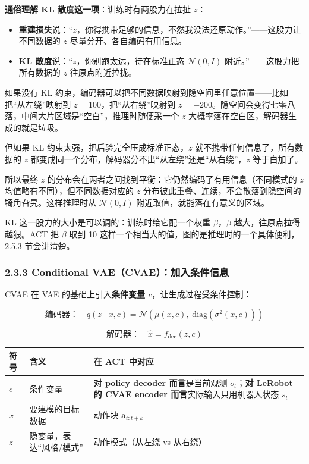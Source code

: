 \documentclass[
  chinese,
]{ctexart}
\providecommand{\tightlist}{%
  \setlength{\itemsep}{0pt}\setlength{\parskip}{0pt}}
\begin{document}
\textbf{通俗理解 KL 散度这一项}：训练时有两股力在拉扯 \(z\)：

\begin{itemize}
\tightlist
\item
  \textbf{重建损失}说：``\(z\)，你得携带足够的信息，不然我没法还原动作。''------这股力让不同数据的
  \(z\) 尽量分开、各自编码有用信息。
\item
  \textbf{KL 散度}说：``\(z\)，你别跑太远，待在标准正态
  \(\mathcal{N}(0, I)\) 附近。''------这股力把所有数据的 \(z\)
  往原点附近拉拢。
\end{itemize}

如果没有 KL
约束，编码器可以把不同数据映射到隐空间里任意位置------比如把``从左绕''映射到
\(z=100\)，把``从右绕''映射到
\(z=-200\)。隐空间会变得七零八落，中间大片区域是``空白''，推理时随便采一个
\(z\) 大概率落在空白区，解码器生成的就是垃圾。

但如果 KL 约束太强，把后验完全压成标准正态，\(z\)
就不携带任何信息了，所有数据的 \(z\)
都变成同一个分布，解码器分不出``从左绕''还是``从右绕''，\(z\)
等于白加了。

所以最终 \(z\)
的分布会在两者之间找到平衡：它仍然编码了有用信息（不同模式的 \(z\)
均值略有不同），但不同数据对应的 \(z\)
分布彼此重叠、连续，不会散落到隐空间的犄角旮旯。这样推理时从
\(\mathcal{N}(0, I)\) 附近取值，就能落在有意义的区域。

KL 这一股力的大小是可以调的：训练时给它配一个权重 \(\beta\)，\(\beta\)
越大，往原点拉得越狠。ACT 把 \(\beta\) 取到 10
这样一个相当大的值，图的是推理时的一个具体便利，2.5.3 节会讲清楚。

\subsubsection{2.3.3 Conditional
VAE（CVAE）：加入条件信息}\label{conditional-vaecvaeux52a0ux5165ux6761ux4ef6ux4fe1ux606f}

CVAE 在 VAE 的基础上引入\textbf{条件变量 \(c\)}，让生成过程受条件控制：

\[
\text{编码器：} \quad q(z \mid x, c) = \mathcal{N}\!\left(\mu(x, c),\; \text{diag}(\sigma^2(x, c))\right)
\]

\[
\text{解码器：} \quad \hat{x} = f_{\text{dec}}(z, c)
\]

\begin{center}
\begin{tabular}{@{}>{\raggedright\arraybackslash}p{} >{\raggedright\arraybackslash}p{} >{\raggedright\arraybackslash}p{}@{}}
\toprule\noalign{}
符号 & 含义 & 在 ACT 中对应 \\
\midrule\noalign{}
\(c\) & 条件变量 & \textbf{对 policy decoder 而言}是当前观测 \(o_t\)；\textbf{对 LeRobot 的 CVAE encoder 而言}实际输入只用机器人状态 \(s_t\) \\
\(x\) & 要建模的目标数据 & 动作块 \(\mathbf{a}_{t:t+k}\) \\
\(z\) & 隐变量，表达``风格/模式'' & 动作模式（从左绕 vs 从右绕） \\
\bottomrule\noalign{}
\end{tabular}
\end{center}
\end{document}
